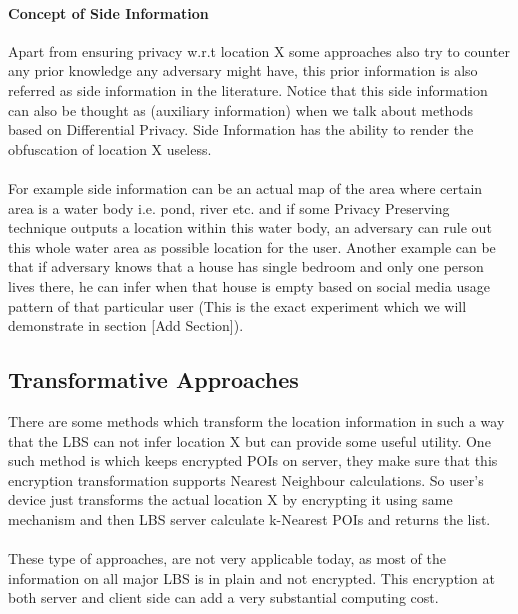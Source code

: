 \documentclass[12pt]{report}
\theoremstyle{named}
\begin{document}
\paragraph{Concept of Side Information}
Apart from ensuring privacy w.r.t location X some approaches also try to counter any prior knowledge any adversary might have, this prior information is also referred as side information in the literature. Notice that this side information can also be thought as (auxiliary information) when we talk about methods based on Differential Privacy. Side Information has the ability to render the obfuscation of location X useless. 


\paragraph{}
For example side information can be an actual map of the area where certain area is a water body i.e. pond, river etc. and if some Privacy Preserving technique outputs a location within this water body, an adversary can rule out this whole water area as possible location for the user. Another example can be that if adversary knows that a house has single bedroom and only one person lives there, he can infer when that house is empty based on social media usage pattern of that particular user (This is the exact experiment which we will demonstrate in section [Add Section]).

\subsection{Transformative Approaches}
There are some methods which transform the location information in such a way that the LBS can not infer location X but can provide some useful utility. One such method is \cite{khoshgozaran2007blind} which keeps encrypted POIs on server, they make sure that this encryption transformation supports Nearest Neighbour calculations. So user's device just transforms the actual location X by encrypting it using same mechanism and then LBS server calculate k-Nearest POIs and returns the list.

\paragraph{}
These type of approaches, are not very applicable today, as most of the information on all major LBS is in plain and not encrypted. This encryption at both server and client side can add a very substantial computing cost.
\end{document}
